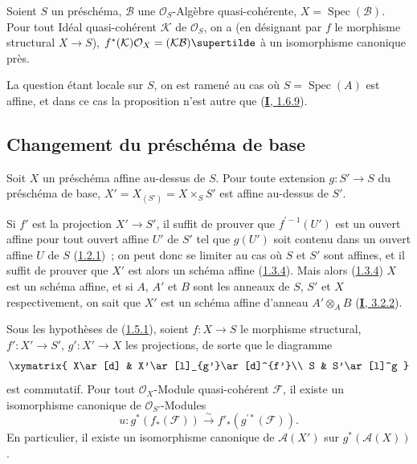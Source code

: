 \begin{proposition}[1.4.11]
\label{II.1.4.11-fr}
Soient $S$ un préschéma, $\mathcal{B}$ une $\mathcal{O}_S$-Algèbre
quasi-cohérente, $X=\operatorname{Spec}(\mathcal{B})$. Pour tout Idéal
quasi-cohérent $\mathcal{K}$ de $\mathcal{O}_S$, on a (en désignant par $f$
le morphisme structural $X\to S$),
$f^*(\mathcal{K})\mathcal{O}_X=(\mathcal{K}\mathcal{B})\supertilde$ à un
isomorphisme canonique près.
\end{proposition}

La question étant locale sur $S$, on est ramené au cas où
$S=\operatorname{Spec}(A)$ est affine, et dans ce cas la proposition n'est
autre que (\hyperref[I.1.6.9-fr]{\textbf{I}, 1.6.9}).

\subsection{Changement du préschéma de base}
\label{II.1.5-fr}

\begin{proposition}[1.5.1]
\label{II.1.5.1-fr}
Soit $X$ un préschéma affine au-dessus de $S$. Pour toute extension
$g:S'\to S$ du préschéma de base, $X'=X_{(S')}=X\times_S S'$ est affine
au-dessus de $S'$.
\end{proposition}

Si $f'$ est la projection $X'\to S'$, il suffit de prouver que
$f^{\prime-1}(U')$ est un ouvert affine pour tout ouvert affine $U'$ de $S'$
tel que $g(U')$ soit contenu dans un ouvert affine $U$ de $S$
(\hyperref[II.1.2.1-fr]{1.2.1})~; on peut donc se limiter au cas où $S$ et
$S'$ sont affines, et il suffit de prouver que $X'$ est alors un schéma
affine (\hyperref[II.1.3.4-fr]{1.3.4}). Mais alors
(\hyperref[II.1.3.4-fr]{1.3.4}) $X$ est un schéma affine, et si $A$, $A'$ et
$B$ sont les anneaux de $S$, $S'$ et $X$ respectivement, on sait que $X'$ est
un schéma affine d'anneau $A'\otimes_A B$
(\hyperref[I.3.2.2-fr]{\textbf{I}, 3.2.2}).

\begin{corollary}[1.5.2]
\label{II.1.5.2-fr}
Sous les hypothèses de \textup{(\hyperref[II.1.5.1-fr]{1.5.1})}, soient $f:X\to S$
le morphisme structural, $f':X'\to S'$, $g':X'\to X$ les projections, de
sorte que le diagramme
\[
  \xymatrix{
    X\ar[d] & X'\ar[l]_{g'}\ar[d]^{f'}\\
    S & S'\ar[l]^g
  }
\]
est commutatif. Pour tout $\mathcal{O}_X$-Module quasi-cohérent $\mathcal{F}$,
il existe un isomorphisme canonique de $\mathcal{O}_{S'}$-Modules
\[
  u:g^*(f_*(\mathcal{F}))\xrightarrow{\sim}
  f'_*(g^{\prime*}(\mathcal{F})).
  \tag{1.5.2.1}\label{II.1.5.2.1-fr}
\]
En particulier, il existe un isomorphisme canonique de $\mathcal{A}(X')$ sur
$g^*(\mathcal{A}(X))$.
\end{corollary}

